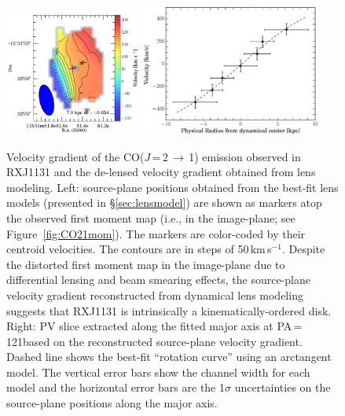 \documentclass[]{emulateapj}
\newcommand{\rarr}{$\rightarrow$}
\newcommand{\bco}{\mbox{CO($J$\,=\,2\,\rarr\,1)}\xspace}
\newcommand{\kms}{\mbox{km\,s$^{-1}$}\xspace}
\newcommand{\Fig}[1]{Figure~\ref{fig:#1}}
\newcommand{\Sec}[1]{\S\ref{sec:#1}}
\begin{document}
\begin{figure}[!htbp]
\centering
\includegraphics[trim=0 0 30 0, clip, width=0.4\textwidth]{f9a.pdf}
\includegraphics[width=0.525\textwidth]{f9b.eps}
\caption{Velocity gradient of the \bco emission observed in RXJ1131 and the de-lensed velocity gradient obtained from lens modeling.
Left: source-plane positions obtained from the best-fit lens models (presented in \Sec{lensmodel}) are shown
as markers
atop the observed first moment map (i.e., in the image-plane; see \Fig{CO21mom}).
The markers are color-coded by their centroid velocities.
The contours are in steps of 50\,\kms.
Despite the distorted first moment map in the image-plane due to differential lensing and beam smearing effects, the source-plane velocity gradient reconstructed from dynamical lens modeling suggests that
RXJ1131 is intrinsically a kinematically-ordered disk.
Right: PV slice extracted along the fitted major axis at PA\,=\,121\degr based on
the reconstructed source-plane velocity gradient.
Dashed line shows the best-fit ``rotation curve'' using an arctangent model.
The vertical error bars show the channel width for
each model and the horizontal error bars are the
1$\sigma$ uncertainties on the source-plane positions along the major axis.
\label{fig:PV}}
\end{figure}
\end{document}
